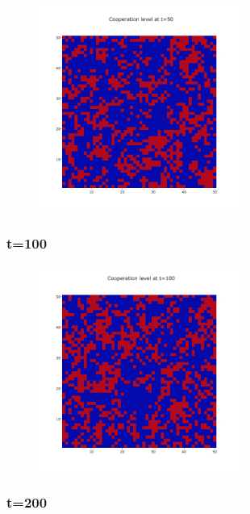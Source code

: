 \documentclass[11pt]{article}
\begin{document}
\begin{figure}[H]
\centering
   \includegraphics[width=0.6\textwidth]{img/part2/part2-moore-visu-50.png}
\end{figure}

\subsubsection{t=100}

\begin{figure}[H]
\centering
   \includegraphics[width=0.6\textwidth]{img/part2/part2-moore-visu-100.png}
\end{figure}

\subsubsection{t=200}
\end{document}
